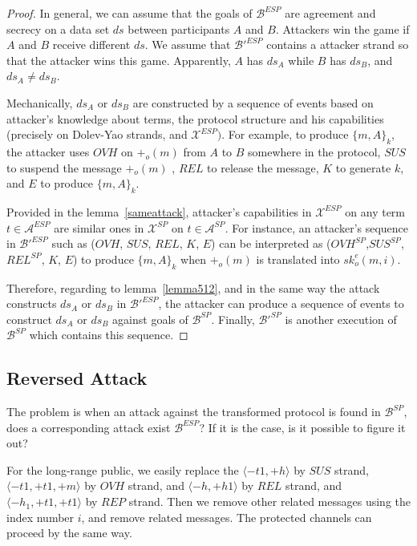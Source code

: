 \begin{proof}
In general, we can assume that the goals of $\mathcal{B}^{ESP}$ are agreement and secrecy on a data set $ds$ between participants $A$ and $B$.  Attackers win the game if $A$ and $B$ receive different $ds$. We assume that $\mathcal{B'}^{ESP}$ contains a attacker strand so that the attacker wins this game. Apparently, $A$ has $ds_A$ while $B$ has $ds_B$, and $ds_A \not= ds_B$. 

Mechanically, $ds_A$ or $ds_B$ are constructed by a sequence of events based on attacker's knowledge about terms, the protocol structure and his capabilities (precisely on Dolev-Yao strands, and $\mathcal{X}^{ESP})$. For example, to produce $\{m,A\}_k$, the attacker uses $OVH$ on $+_o(m)$ from $A$ to $B$ somewhere in the protocol, $SUS$ to suspend the message $+_o(m)$ , $REL$ to release the message, $K$ to generate $k$, and $E$ to produce $\{m,A\}_k$. 

Provided in the lemma~\ref{sameattack}, attacker's capabilities in $\mathcal{X}^{ESP}$ on any term $t \in \mathcal{A}^{ESP}$ are similar ones in $\mathcal{X}^{SP}$ on $t \in \mathcal{A}^{SP}$. For instance, an attacker's sequence in $\mathcal{B'}^{ESP}$ such as ($OVH$, $SUS$, $REL$, $K$, $E$) can be interpreted as ($OVH^{SP}$,$SUS^{SP}$, $REL^{SP}$, $K$, $E$) to produce $\{m,A\}_k$ when $+_o(m)$ is translated into $sk^e_o(m,i)$. 

Therefore, regarding to lemma~\ref{lemma512}, and in the same way the attack constructs $ds_A$ or $ds_B$ in $\mathcal{B'}^{ESP}$, the attacker can produce a sequence of events to construct $ds_A$ or $ds_B$ against goals of $\mathcal{B}^{SP}$. Finally, $\mathcal{B'}^{SP}$ is another execution of $\mathcal{B}^{SP}$ which contains this sequence.
\end{proof}

\subsection{Reversed Attack}\label{reverse}

The problem is when an attack against the transformed protocol is found in $\mathcal{B}^{SP}$, does a corresponding attack exist $\mathcal{B}^{ESP}$? If it is the case, is it possible to figure it out? 

For the long-range public, we easily replace the $\langle -t1, +h \rangle $ by $SUS$ strand, $\langle -t1,+t1,+m \rangle$ by $OVH$ strand, and $ \langle -h,+h1\rangle$ by $REL$ strand, and $ \langle -h_1, +t1,+t1 \rangle$ by $REP$ strand. Then we remove other related messages using the index number $i$, and remove related messages. The protected channels can proceed by the same way. 

